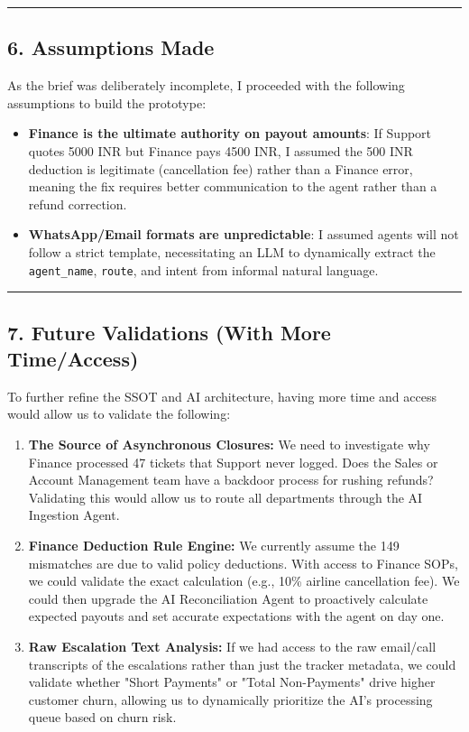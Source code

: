 \documentclass[
]{article}
\providecommand{\tightlist}{%
  \setlength{\itemsep}{0pt}\setlength{\parskip}{0pt}}
\begin{document}
\begin{center}\rule{0.5\linewidth}{0.5pt}\end{center}

\subsection{6. Assumptions Made}\label{assumptions-made}

As the brief was deliberately incomplete, I proceeded with the following assumptions to build the prototype: 
\begin{itemize}
\item \textbf{Finance is the ultimate authority on payout amounts}: If Support quotes 5000 INR but Finance pays 4500 INR, I assumed the 500 INR deduction is legitimate (cancellation fee) rather than a Finance error, meaning the fix requires better communication to the agent rather than a refund correction. 
\item \textbf{WhatsApp/Email formats are unpredictable}: I assumed agents will not follow a strict template, necessitating an LLM to dynamically extract the \texttt{agent\_name}, \texttt{route}, and intent from informal natural language.
\end{itemize}

\begin{center}\rule{0.5\linewidth}{0.5pt}\end{center}

\subsection{7. Future Validations (With More Time/Access)}\label{future-validations}

To further refine the SSOT and AI architecture, having more time and access would allow us to validate the following:
\begin{enumerate}
\def\labelenumi{\arabic{enumi}.}
\tightlist
\item \textbf{The Source of Asynchronous Closures:} We need to investigate why Finance processed 47 tickets that Support never logged. Does the Sales or Account Management team have a backdoor process for rushing refunds? Validating this would allow us to route all departments through the AI Ingestion Agent.
\item \textbf{Finance Deduction Rule Engine:} We currently assume the 149 mismatches are due to valid policy deductions. With access to Finance SOPs, we could validate the exact calculation (e.g., 10\% airline cancellation fee). We could then upgrade the AI Reconciliation Agent to proactively calculate expected payouts and set accurate expectations with the agent on day one.
\item \textbf{Raw Escalation Text Analysis:} If we had access to the raw email/call transcripts of the escalations rather than just the tracker metadata, we could validate whether "Short Payments" or "Total Non-Payments" drive higher customer churn, allowing us to dynamically prioritize the AI's processing queue based on churn risk.
\end{enumerate}
\end{document}
